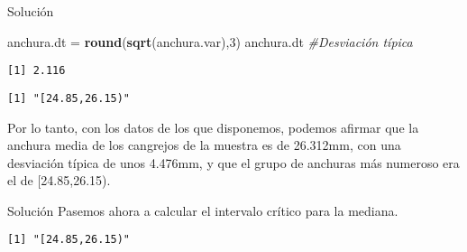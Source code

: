 \documentclass[
  ignorenonframetext,
]{beamer}
\newenvironment{Shaded}{\begin{snugshade}}{\end{snugshade}}
\newcommand{\CommentTok}[1]{\textcolor[rgb]{0.56,0.35,0.01}{\textit{#1}}}
\newcommand{\DecValTok}[1]{\textcolor[rgb]{0.00,0.00,0.81}{#1}}
\newcommand{\FloatTok}[1]{\textcolor[rgb]{0.00,0.00,0.81}{#1}}
\newcommand{\KeywordTok}[1]{\textcolor[rgb]{0.13,0.29,0.53}{\textbf{#1}}}
\newcommand{\NormalTok}[1]{#1}
\newcommand{\OperatorTok}[1]{\textcolor[rgb]{0.81,0.36,0.00}{\textbf{#1}}}
\newcommand{\StringTok}[1]{\textcolor[rgb]{0.31,0.60,0.02}{#1}}
\begin{document}
\begin{frame}[fragile]{Solución}
\protect\hypertarget{soluciuxf3n-32}{}
\begin{Shaded}
\begin{Highlighting}[]
\NormalTok{anchura.dt =}\StringTok{ }\KeywordTok{round}\NormalTok{(}\KeywordTok{sqrt}\NormalTok{(anchura.var),}\DecValTok{3}\NormalTok{)}
\NormalTok{anchura.dt }\CommentTok{\#Desviación típica}
\end{Highlighting}
\end{Shaded}

\begin{verbatim}
[1] 2.116
\end{verbatim}

\begin{Shaded}
\end{Shaded}

\begin{verbatim}
[1] "[24.85,26.15)"
\end{verbatim}

Por lo tanto, con los datos de los que disponemos, podemos afirmar que
la anchura media de los cangrejos de la muestra es de 26.312mm, con una
desviación típica de unos 4.476mm, y que el grupo de anchuras más
numeroso era el de {[}24.85,26.15).
\end{frame}

\begin{frame}[fragile]{Solución}
\protect\hypertarget{soluciuxf3n-33}{}
Pasemos ahora a calcular el intervalo crítico para la mediana.

\begin{Shaded}
\end{Shaded}

\begin{verbatim}
[1] "[24.85,26.15)"
\end{verbatim}
\end{frame}
\end{document}
